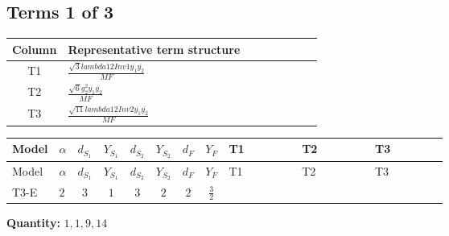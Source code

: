 \documentclass[8pt]{article}
\begin{document}
\begin{landscape}
\subsection*{Terms 1 of 3}
\begin{center}
\begin{tabular}{@{}c >{\raggedright\arraybackslash}p{0.82\linewidth}@{}}
\toprule
Column & Representative term structure \\
\midrule
T1 & \(\displaystyle \frac{\sqrt{3} lambda12Inv1 \overline{y_{1}} \overline{y_{2}}}{MF}\) \\
\midrule
T2 & \(\displaystyle \frac{\sqrt{6} g_{2}^{2} \overline{y_{1}} \overline{y_{2}}}{MF}\) \\
\midrule
T3 & \(\displaystyle \frac{\sqrt{11} lambda12Inv2 \overline{y_{1}} \overline{y_{2}}}{MF}\) \\
\midrule
\bottomrule
\end{tabular}
\end{center}
\smallskip
\tiny
\begin{longtable}{@{}llcccccc >{\raggedright\arraybackslash}p{0.21\linewidth} >{\raggedright\arraybackslash}p{0.21\linewidth} >{\raggedright\arraybackslash}p{0.21\linewidth}@{}}
\toprule
Model & $\alpha$ & $d_{S_1}$ & $Y_{S_1}$ & $d_{S_2}$ & $Y_{S_2}$ & $d_F$ & $Y_F$ & T1 & T2 & T3 \\
\midrule
\endfirsthead
\toprule
Model & $\alpha$ & $d_{S_1}$ & $Y_{S_1}$ & $d_{S_2}$ & $Y_{S_2}$ & $d_F$ & $Y_F$ & T1 & T2 & T3 \\
\midrule
\endhead
T3-E & $2$ & $3$ & $1$ & $3$ & $2$ & $2$ & $\frac{3}{2}$ & \scriptsize\adjustbox{max width=\linewidth}{$\begin{gathered} - \frac{\sqrt{3} lambda12Inv1 \overline{y_{1}} \overline{y_{2}}}{6 MF}\end{gathered}$} & \scriptsize\adjustbox{max width=\linewidth}{$\begin{gathered} \frac{\sqrt{6} g_{2}^{2} \overline{y_{1}} \overline{y_{2}}}{3 MF}\end{gathered}$} & \scriptsize\adjustbox{max width=\linewidth}{$\begin{gathered} \frac{3 \sqrt{11} lambda12Inv2 \overline{y_{1}} \overline{y_{2}}}{22 MF}\end{gathered}$} \\
\midrule
\bottomrule
\end{longtable}
\clearpage
\noindent\textbf{Quantity: }$\mathrm{1,1,9,14}$\par\smallskip

\end{landscape}
\end{document}
